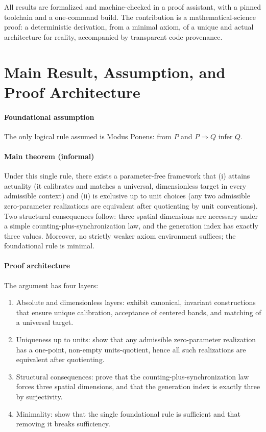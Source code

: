 \documentclass{article}
\begin{document}
All results are formalized and machine-checked in a proof assistant, with a pinned toolchain and a one-command build. The contribution is a mathematical-science proof: a deterministic derivation, from a minimal axiom, of a unique and actual architecture for reality, accompanied by transparent code provenance.

\section{Main Result, Assumption, and Proof Architecture}
\paragraph{Foundational assumption} The only logical rule assumed is Modus Ponens: from $P$ and $P\Rightarrow Q$ infer $Q$.

\paragraph{Main theorem (informal)} Under this single rule, there exists a parameter-free framework that (i) attains actuality (it calibrates and matches a universal, dimensionless target in every admissible context) and (ii) is exclusive up to unit choices (any two admissible zero-parameter realizations are equivalent after quotienting by unit conventions). Two structural consequences follow: three spatial dimensions are necessary under a simple counting-plus-synchronization law, and the generation index has exactly three values. Moreover, no strictly weaker axiom environment suffices; the foundational rule is minimal.

\paragraph{Proof architecture} The argument has four layers:
\begin{enumerate}
  \item Absolute and dimensionless layers: exhibit canonical, invariant constructions that ensure unique calibration, acceptance of centered bands, and matching of a universal target.
  \item Uniqueness up to units: show that any admissible zero-parameter realization has a one-point, non-empty units-quotient, hence all such realizations are equivalent after quotienting.
  \item Structural consequences: prove that the counting-plus-synchronization law forces three spatial dimensions, and that the generation index is exactly three by surjectivity.
  \item Minimality: show that the single foundational rule is sufficient and that removing it breaks sufficiency.
\end{enumerate}
\end{document}
